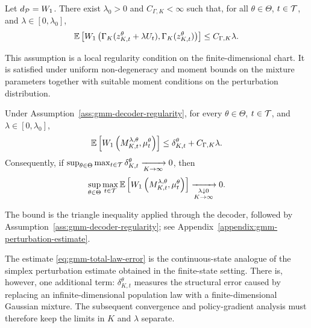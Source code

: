 \begin{assumption}
    \label{ass:gmm-decoder-regularity}
    Let $d_{\cal P}=W_1$. There exist $\lambda_0>0$ and $C_{\Gamma,K}<\infty$ such that, for all $\theta\in\Theta$, $t\in{\cal T}$, and $\lambda\in[0,\lambda_0]$,
    \begin{align}
        \label{eq:gmm-decoder-lipschitz}
        \mathbb{E}\left[W_1\left(\Gamma_K(z_{K,t}^\theta + \lambda U_t), \Gamma_K(z_{K,t}^\theta) \right) \right] \leq C_{\Gamma,K}\lambda.
    \end{align}
\end{assumption}

This assumption is a local regularity condition on the finite-dimensional chart. It is satisfied under uniform non-degeneracy and moment bounds on the mixture parameters together with suitable moment conditions on the perturbation distribution.

\begin{theorem}
    \label{theorem:gmm-perturbation-estimate}
    Under Assumption~\ref{ass:gmm-decoder-regularity}, for every $\theta\in\Theta$, $t\in{\cal T}$, and $\lambda\in[0,\lambda_0]$,
    \begin{align}
        \label{eq:gmm-total-law-error}
        \mathbb{E}\left[W_1\left(M_{K,t}^{\lambda,\theta},\mu_t^\theta\right) \right] \leq \delta_{K,t}^\theta + C_{\Gamma,K}\lambda.
    \end{align}
    Consequently, if $\sup_{\theta\in\Theta}\max_{t\in{\cal T}}\delta_{K,t}^\theta\xrightarrow[K\to\infty]{}0$, then
    \begin{align}
        \sup_{\theta\in\Theta}\max_{t\in{\cal T}}\mathbb{E}\left[W_1\left(M_{K,t}^{\lambda,\theta}, \mu_t^\theta\right)\right]\xrightarrow[\substack{\lambda\downarrow0\\ K\to\infty}]{}0.
    \end{align}
\end{theorem}

The bound is the triangle inequality applied through the decoder, followed by Assumption~\ref{ass:gmm-decoder-regularity}; see Appendix~\ref{appendix:gmm-perturbation-estimate}.

The estimate \eqref{eq:gmm-total-law-error} is the continuous-state analogue of the simplex perturbation estimate obtained in the finite-state setting. There is, however, one additional term: $\delta_{K,t}^\theta$ measures the structural error caused by replacing an infinite-dimensional population law with a finite-dimensional Gaussian mixture. The subsequent convergence and policy-gradient analysis must therefore keep the limits in $K$ and $\lambda$ separate.


